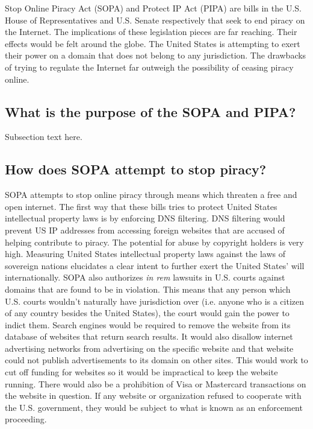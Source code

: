 \documentclass[11pt,journal,compsoc]{IEEEtran}
\begin{document}
 Stop Online Piracy Act (SOPA) and Protect IP Act (PIPA) are bills in the U.S. House of Representatives and U.S. Senate respectively that seek to end piracy on the Internet. The implications of these legislation pieces are far reaching. Their effects would be felt around the globe. The United States is attempting to exert their power on a domain that does not belong to any jurisdiction. The drawbacks of trying to regulate the Internet far outweigh the possibility of ceasing piracy online.


\subsection{What is the purpose of the SOPA and PIPA?}
Subsection text here.

\subsection{How does SOPA attempt to stop piracy?}
SOPA attempts to stop online piracy through means which threaten a free and open internet. The first way that these bills tries to protect United States intellectual property laws is by enforcing DNS filtering. DNS filtering would prevent US IP addresses from accessing foreign websites that are accused of helping contribute to piracy. The potential for abuse by copyright holders is very high. Measuring United States intellectual property laws against the laws of sovereign nations elucidates a clear intent to further exert the United States' will internationally. SOPA also authorizes \textit{in rem} lawsuits in U.S. courts against domains that are found to be in violation. This means that any person which U.S. courts wouldn't naturally have jurisdiction over (i.e. anyone who is a citizen of any country besides the United States), the court would gain the power to indict them. Search engines would be required to remove the website from its database of websites that return search results. It would also disallow internet advertising networks from advertising on the specific website and that website could not publish advertisements to its domain on other sites. This would work to cut off funding for websites so it would be impractical to keep the website running. There would also be a prohibition of Visa or Mastercard transactions on the website in question. If any website or organization refused to cooperate with the U.S. government, they would be subject to what is known as an enforcement proceeding.
\end{document}
